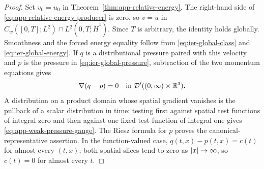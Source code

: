 \begin{proof}
Set \(v_0=u_0\) in Theorem~\ref{thm:app-relative-energy}.  The right-hand
side of \eqref{eq:app-relative-energy-producer} is zero, so
\(v=u\) in \(C_w([0,T];L^2)\cap L^2(0,T;\dot H^1)\).  Since \(T\) is
 arbitrary, the identity holds globally.  Smoothness and the forced energy equality
 follow from \eqref{eq:ier-global-class} and
 \eqref{eq:ier-global-energy}.  If \(q\) is a distributional pressure paired
 with this velocity and \(p\) is the pressure in
 \eqref{eq:ier-global-pressure}, subtraction of the two momentum equations
 gives
 \[
  \nabla(q-p)=0
  \quad\text{in }\mathcal D'((0,\infty)\times\mathbb R^3).
 \]
 A distribution on a product domain whose spatial gradient vanishes is the
 pullback of a scalar distribution in time: testing first against spatial test
 functions of integral zero and then against one fixed test function of
 integral one gives \eqref{eq:app-weak-pressure-gauge}.  The Riesz formula for
 \(p\) proves the canonical-representative assertion.  In the function-valued
 case, \(q(t,x)-p(t,x)=c(t)\) for almost every \((t,x)\); both spatial slices
 tend to zero as \(\left|x\right|\to\infty\), so \(c(t)=0\) for almost every \(t\).
\end{proof}
